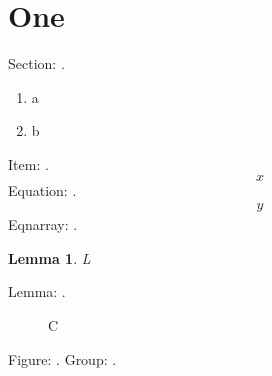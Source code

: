 \documentclass{article}
\newtheorem{lem}[thm]{Lemma}
\begin{document}
\section{One}\label{s1}
Section: \lastctr.
\begin{enumerate}\item a \item b\label{i2}\end{enumerate}
Item: \lastctr.
\begin{equation}x\label{e1}\end{equation}
Equation: \lastctr.
\begin{eqnarray}y\label{e2}\end{eqnarray}
Eqnarray: \lastctr.
\begin{lem}L\label{l1}\end{lem}
Lemma: \lastctr.
\begin{figure}\caption{C}\label{g1}\end{figure}
Figure: \lastctr.
{}\label{g}
Group: \lastctr.
\end{document}
